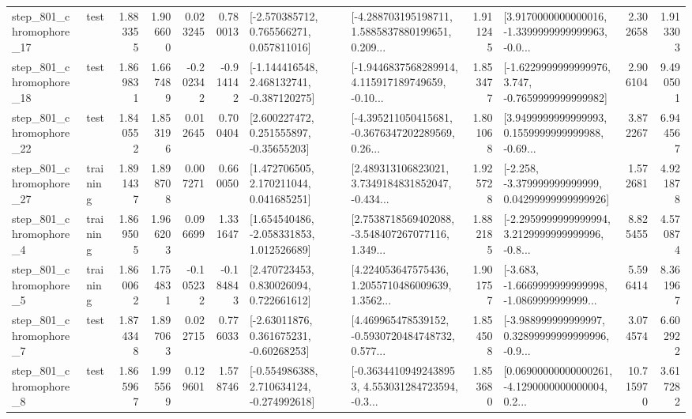 \begin{tabular}{llrrrrllrlrr}
  step\_801\_chromophore\_17 &      test &      1.883355 &    1.906600 &      0.023245 &  0.780013 &    [-2.570385712, 0.765566271, 0.057811016] &  [-4.288703195198711, 1.5885837880199651, 0.209... &       1.911245 &  [3.9170000000000016, -1.3399999999999963, -0.0... &            2.302658 &          1.913303 \\
  step\_801\_chromophore\_18 &      test &      1.869831 &    1.667489 &     -0.202342 & -0.914142 &   [-1.144416548, 2.468132741, -0.387120275] &  [-1.9446837568289914, 4.115917189749659, -0.10... &       1.853477 &  [-1.6229999999999976, 3.747, -0.7659999999999982] &            2.906104 &          9.490501 \\
  step\_801\_chromophore\_22 &      test &      1.840552 &    1.853196 &      0.012645 &  0.700404 &     [2.600227472, 0.251555897, -0.35655203] &  [-4.395211050415681, -0.3676347202289569, 0.26... &       1.801068 &  [3.9499999999999993, 0.1559999999999988, -0.69... &            3.872267 &          6.944567 \\
  step\_801\_chromophore\_27 &  training &      1.891437 &    1.898708 &      0.007271 &  0.660050 &     [1.472706505, 2.170211044, 0.041685251] &  [2.489313106823021, 3.7349184831852047, -0.434... &       1.925728 &  [-2.258, -3.379999999999999, 0.04299999999999926] &            1.572681 &          4.921878 \\
   step\_801\_chromophore\_4 &  training &      1.869505 &    1.966203 &      0.096699 &  1.331647 &    [1.654540486, -2.058331853, 1.012526689] &  [2.7538718569402088, -3.548407267077116, 1.349... &       1.882185 &  [-2.2959999999999994, 3.2129999999999996, -0.8... &            8.825455 &          4.570874 \\
   step\_801\_chromophore\_5 &  training &      1.860062 &    1.754831 &     -0.105232 & -0.184843 &     [2.470723453, 0.830026094, 0.722661612] &  [4.224053647575436, 1.2055710486009639, 1.3562... &       1.901757 &  [-3.683, -1.6669999999999998, -1.0869999999999... &            5.596414 &          8.361967 \\
   step\_801\_chromophore\_7 &      test &      1.874348 &    1.897063 &      0.022715 &  0.776033 &     [-2.63011876, 0.361675231, -0.60268253] &  [4.469965478539152, -0.5930720484748732, 0.577... &       1.854508 &  [-3.988999999999997, 0.32899999999999996, -0.9... &            3.074574 &          6.602922 \\
   step\_801\_chromophore\_8 &      test &      1.865967 &    1.995569 &      0.129601 &  1.578746 &   [-0.554986388, 2.710634124, -0.274992618] &  [-0.36344109492438953, 4.553031284723594, -0.3... &       1.853680 &  [0.06900000000000261, -4.1290000000000004, 0.2... &           10.715970 &          3.617282 \\

\end{tabular}
